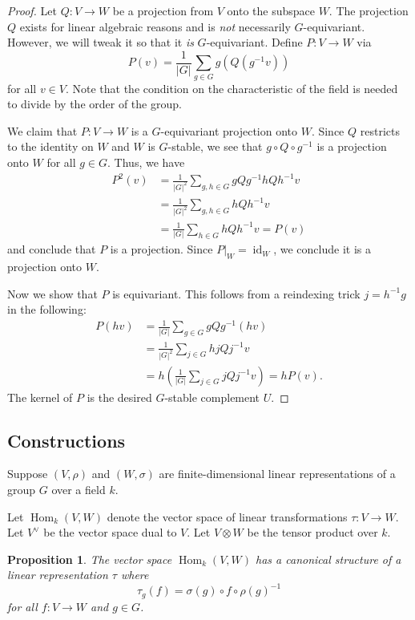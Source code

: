 \documentclass[12pt]{article}
\theoremstyle{plain}
\newtheorem{proposition}[theorem]{Proposition}
\theoremstyle{definition}
\theoremstyle{remark}
\numberwithin{equation}{section}
\begin{document}
\begin{proof}
Let $Q: V \to W$ be a projection from $V$ onto the subspace $W$.
The projection $Q$ exists for linear algebraic reasons
and is \emph{not} necessarily $G$-equivariant.
However, we will tweak it so that it \emph{is} $G$-equivariant.
Define $P : V \to W$ via
\[
P(v) = \frac{1}{|G|} \sum_{g \in G} g\left( Q\left( g^{-1} v\right)\right)
\]
for all $v \in V$.  Note that the condition on the characteristic of the
field is needed to divide by the order of the group.

We claim that $P : V \to W$ is a $G$-equivariant projection onto $W$.
Since $Q$ restricts to the identity on $W$ and $W$ is $G$-stable,
we see that
$g \circ Q \circ g^{-1}$ is a projection onto $W$
for all $g \in G$.  Thus, we have
\begin{align*}
P^2(v) &=
\frac{1}{|G|^2} \sum_{g,h \in G} gQg^{-1} hQh^{-1}v\\
&=\frac{1}{|G|^2} \sum_{g,h \in G} hQh^{-1}v\\
&=\frac{1}{|G|} \sum_{h \in G} hQh^{-1}v = P(v)
\end{align*}
and conclude that $P$ is a projection.  Since
$P|_W=\operatorname{id}_W$, we conclude it is a projection onto $W$.

Now we show that $P$ is equivariant.
This follows from a reindexing trick $j=h^{-1}g$ in the following:
\begin{align*}
P(hv) &=
\frac{1}{|G|} \sum_{g \in G} gQg^{-1} (hv)\\
&=\frac{1}{|G|^2} \sum_{j \in G} hjQj^{-1}v\\
&=h\left(\frac{1}{|G|} \sum_{j \in G} jQj^{-1}v\right) = hP(v).
\end{align*}
The kernel of $P$ is the desired $G$-stable complement $U$.
\end{proof}

\subsection{Constructions}

Suppose $(V,\rho)$ and $(W,\sigma)$ are finite-dimensional linear
representations of a group $G$ over a field $k$.

Let $\operatorname{Hom}_k(V,W)$ denote the vector space of linear transformations
$\tau : V \to W$.
Let $V^\vee$ be the vector space dual to $V$.
Let $V \otimes W$ be the tensor product over $k$.

\begin{proposition}
The vector space $\operatorname{Hom}_k(V,W)$ has a canonical structure of a linear
representation $\tau$ where
\[
 \tau_g(f) = \sigma(g) \circ f \circ \rho(g)^{-1}
\]
for all $f : V \to W$ and $g \in G$.
\end{proposition}
\end{document}

